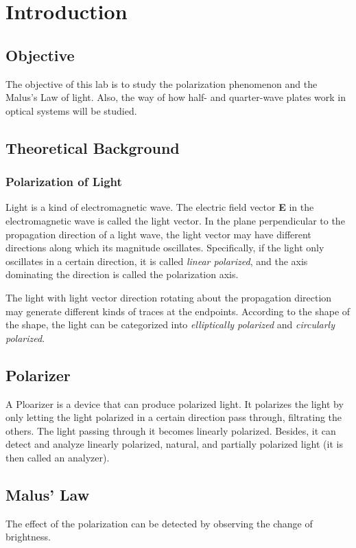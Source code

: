 \documentclass{article}
\begin{document}
		\section{Introduction}
	\subsection{Objective}

The objective of this lab is to study the polarization phenomenon and the Malus's Law of light. Also, the way of how half- and quarter-wave plates work in optical systems will be studied.

		\subsection{Theoretical Background}
	\subsubsection{Polarization of Light}

Light is a kind of electromagnetic wave. The electric field vector \textbf{E} in the electromagnetic wave is called the light vector. In the plane perpendicular to the propagation direction of a light wave, the light vector may have different directions along which its magnitude oscillates. Specifically, if the light only oscillates in a certain direction, it is called \textit{linear polarized}, and the axis dominating the direction is called the polarization axis. 

The light with light vector direction rotating about the propagation direction may generate different kinds of traces at the endpoints. According to the shape of the shape, the light can be categorized into \textit{elliptically polarized} and \textit{circularly polarized}.

	\subsection{Polarizer}

A Ploarizer is a device that can produce polarized light. It polarizes the light by only letting the light polarized in a certain direction pass through, filtrating the others. The light passing through it becomes linearly polarized. Besides, it can detect and analyze linearly polarized, natural, and partially polarized light (it is then called an analyzer).

	\subsection{Malus' Law}
The effect of the polarization can be detected by observing the change of brightness.
\end{document}
